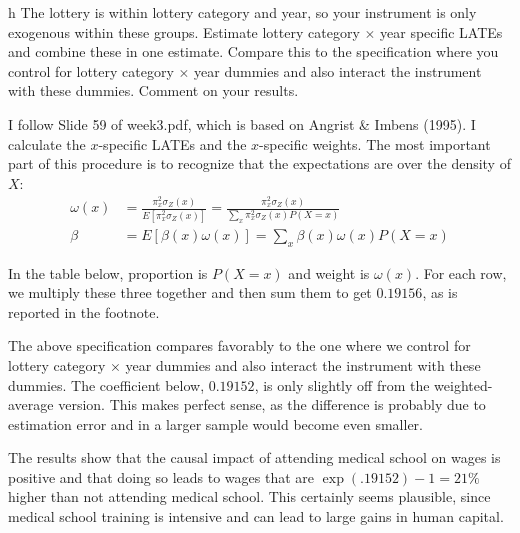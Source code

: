 \documentclass{article}
\begin{document}
\begin{problem}{h}
The lottery is within lottery category and year, so your instrument is only exogenous within these groups. Estimate lottery category $\times$ year specific LATEs and combine these in one estimate. Compare this to the specification where you control for lottery category $\times$ year dummies and also interact the instrument with these dummies. Comment on your results.
\end{problem}
\begin{solution}
I follow Slide 59 of week3.pdf, which is based on Angrist \& Imbens (1995). I calculate the $x$-specific LATEs and the $x$-specific weights. The most important part of this procedure is to recognize that the expectations are over the density of $X$:
\begin{align*}
    \omega(x) &= \frac{\pi_x^2 \sigma_Z(x)}{E[\pi_x^2 \sigma_Z(x)]} = \frac{\pi_x^2 \sigma_Z(x)}{\sum_x \pi_x^2 \sigma_Z(x) P(X=x)} \\
    \beta &= E[\beta(x)\omega(x)] = \sum_x \beta(x)\omega(x) P(X=x)
\end{align*}

In the table below, proportion is $P(X=x)$ and weight is $\omega(x)$. For each row, we multiply these three together and then sum them to get $0.19156$, as is reported in the footnote.
\begin{table}[H]
    \centering
    
\end{table}
The above specification compares favorably to the one where we control for lottery category $\times$ year dummies and also interact the instrument with these dummies. The coefficient below, $0.19152$, is only slightly off from the weighted-average version. This makes perfect sense, as the difference is probably due to estimation error and in a larger sample would become even smaller.
\begin{table}[H]
    \centering
    
\end{table}
The results show that the causal impact of attending medical school on wages is positive and that doing so leads to wages that are $\operatorname{exp}(.19152)-1=21\%$ higher than not attending medical school. This certainly seems plausible, since medical school training is intensive and can lead to large gains in human capital.
    




\end{solution}
\end{document}
